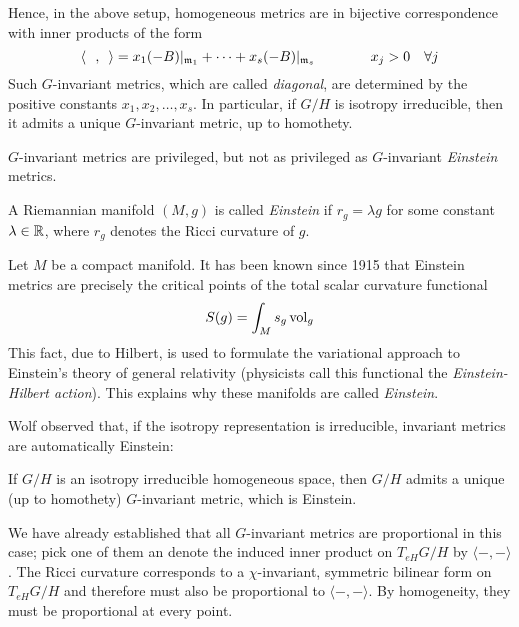 Hence, in the above setup, homogeneous metrics are in bijective correspondence with inner products of the form
\begin{equation}\label{eq:diagonalKillingmetrics}
	\langle \ \ ,\ \, \rangle =x_1(-B)|_{\mathfrak{m}_1}+\dots+x_s(-B)|_{\mathfrak{m}_s} 
	\qquad \qquad x_j>0\ \ \ \forall j
\end{equation}
Such $G$-invariant metrics, which are called \emph{diagonal}, are determined by the positive constants $x_1,x_2,\dots,x_s$. In particular, if $G/H$ is isotropy irreducible, then it admits a unique $G$-invariant metric, up to homothety.

$G$-invariant metrics are privileged, but not as privileged as $G$-invariant \emph{Einstein} metrics.

\begin{mydef}
	A Riemannian manifold $(M,g)$ is called \emph{Einstein} if $r_g=\lambda g$ for some constant $\lambda\in \mathbb{R}$, where $r_g$ denotes the Ricci curvature of $g$.
\end{mydef}

\begin{rem}
	Let $M$ be a compact manifold. It has been known since 1915 that Einstein metrics are precisely the critical points of the total scalar curvature functional
	\begin{equation*}
	S(g)=\int_M s_g \operatorname{vol}_g
	\end{equation*}
	This fact, due to Hilbert, is used to formulate the variational approach to Einstein's theory of general relativity (physicists call this functional the \emph{Einstein-Hilbert action}). This explains why these manifolds are called \emph{Einstein}.
\end{rem}

Wolf observed that, if the isotropy representation is irreducible, invariant metrics are automatically Einstein:

\begin{prop}
	If $G/H$ is an isotropy irreducible homogeneous space, then $G/H$ admits a unique (up to homothety) $G$-invariant metric, which is Einstein.
\end{prop}
\begin{myproof}
	We have already established that all $G$-invariant metrics are proportional in this case; pick one of them an denote the induced inner product on $T_{eH}G/H$ by $\langle -,-\rangle$. The Ricci curvature corresponds to a $\chi$-invariant, symmetric bilinear form on $T_{eH}G/H$ and therefore must also be proportional to $\langle -,-\rangle$. By homogeneity, they must be proportional at every point.
\end{myproof}

